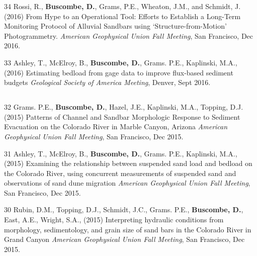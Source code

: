 \documentclass[margin,line]{resume}
\begin{document}
\begin{resume}
\begin{footnotesize}
\begin{list1}
        \item[34] Rossi, R., {\bf Buscombe, D.}, Grams, P.E., Wheaton, J.M., and Schmidt, J. (2016) From Hype to an Operational Tool: Efforts to Establish a Long-Term Monitoring Protocol of Alluvial Sandbars using `Structure-from-Motion' Photogrammetry. {\sl American Geophysical Union Fall Meeting}, San Francisco, Dec 2016.\\        

        \item[33] Ashley, T., McElroy, B., {\bf Buscombe, D.}, Grams. P.E., Kaplinski, M.A., (2016) Estimating bedload from gage data to improve flux-based sediment budgets {\sl Geological Society of America Meeting}, Denver, Sept 2016.\\
        
        
	\end{list1}
        
	\subsection{}
	\begin{list1}	

        \item[32] Grams. P.E., {\bf Buscombe, D.}, Hazel, J.E., Kaplinski, M.A., Topping, D.J. (2015) Patterns of Channel and Sandbar Morphologic Response to Sediment Evacuation on the Colorado River in Marble Canyon, Arizona {\sl American Geophysical Union Fall Meeting}, San Francisco, Dec 2015.\\

        \item[31] Ashley, T., McElroy, B., {\bf Buscombe, D.}, Grams. P.E., Kaplinski, M.A., (2015) Examining the relationship between suspended sand load and bedload on the Colorado River, using concurrent measurements of suspended sand and observations of sand dune migration {\sl American Geophysical Union Fall Meeting}, San Francisco, Dec 2015.\\

        \item[30] Rubin, D.M., Topping, D.J., Schmidt, J.C., Grams. P.E., {\bf Buscombe, D.}, East, A.E., Wright, S.A., (2015) Interpreting hydraulic conditions from morphology, sedimentology, and grain size of sand bars in the Colorado River in Grand Canyon {\sl American Geophysical Union Fall Meeting}, San Francisco, Dec 2015.\\
        

\end{list1}
\end{footnotesize}
\end{resume}
\end{document}
